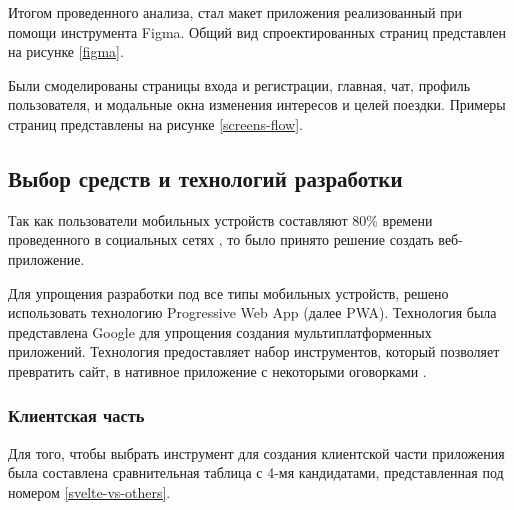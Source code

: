 Итогом проведенного анализа, стал макет приложения реализованный при помощи инструмента Figma. Общий вид спроектированных страниц представлен на рисунке \ref{figma}.


Были смоделированы страницы входа и регистрации, главная, чат, профиль пользователя, и модальные окна изменения интересов и целей поездки. Примеры страниц представлены на рисунке \ref{screens-flow}.


\subsection{Выбор средств и технологий разработки}

Так как пользователи мобильных устройств составляют 80\% времени проведенного в социальных сетях \cite{mobile-vs-desktop-usage}, то было принято решение создать веб-приложение.

Для упрощения разработки под все типы мобильных устройств, решено использовать технологию Progressive Web App (далее PWA). Технология была представлена Google для упрощения создания мультиплатформенных приложений. Технология предоставляет набор инструментов, который позволяет превратить сайт, в нативное приложение с некоторыми оговорками \cite{what-are-pwas}.

\subsubsection{Клиентская часть}

Для того, чтобы выбрать инструмент для создания клиентской части приложения была составлена сравнительная таблица с 4-мя кандидатами, представленная под номером \ref{svelte-vs-others}.


